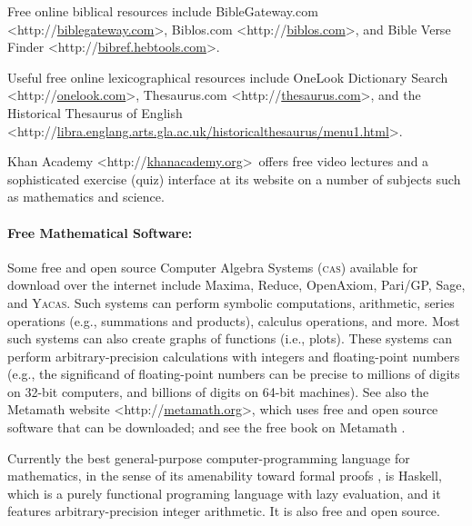\documentclass[letterpaper,12pt]{article}
\newcommand{\dsc}{\discretionary{}{}{}}
\begin{document}
Free online biblical resources include BibleGateway.com \textless http://\dsc \href{http://biblegateway.com}{biblegateway\dsc .com}\textgreater , Biblos.com \textless http://\dsc \href{http://biblos.com}{biblos\dsc .com}\textgreater , and Bible Verse Finder \textless http://\dsc \href{http://bibref.hebtools.com}{bibref\dsc .hebtools\dsc .com}\textgreater .

Useful free online lexicographical resources include OneLook Dictionary Search \textless http://\dsc \href{http://onelook.com}{onelook.com}\textgreater , Thesaurus.com \textless http://\dsc \href{http://thesaurus.com}{thesaurus.com}\textgreater , and the Historical Thesaurus of English \textless http://\dsc \href{http://libra.englang.arts.gla.ac.uk/historicalthesaurus/menu1.html}{libra.englang.arts.gla.ac.uk/\dsc historicalthesaurus/\dsc menu1.html}\textgreater .

Khan Academy \textless http://\dsc \href{http://khanacademy.org}{khanacademy\dsc .org}\textgreater\ offers free video lectures and a sophisticated exercise (quiz) interface at its website on a number of subjects such as mathematics and science.

\paragraph{Free Mathematical Software:}
\label{parag:FreeMathematicalSoftware}

Some free and open source Computer Algebra Systems (\textsc{cas}) available for download over the internet include Maxima, Reduce, \mbox{OpenAxiom}, Pari/GP, Sage, and \textsc{Yacas}. Such systems can perform symbolic computations, arithmetic, series operations (e.g., summations and products), calculus operations, and more. Most such systems can also create graphs of functions (i.e., plots). These systems can perform arbitrary-precision calculations with integers and floating-point numbers (e.g., the significand of floating-point numbers can be precise to millions of digits on 32-bit computers, and billions of digits on 64-bit machines). See also the Metamath website \textless http://\dsc\href{http://metamath.org}{metamath.org}\textgreater , which uses free and open source software that can be downloaded; and see the free book on Metamath \cite{Megill2008}.

Currently the best general-purpose computer-programming language for mathematics, in the sense of its amenability toward formal proofs \cite{KleinEtAl2009-10,KleinEtAl2010-6}, is Haskell, which is a purely functional programing language with lazy evaluation, and it features arbitrary-precision integer arithmetic. It is also free and open source.
\end{document}
